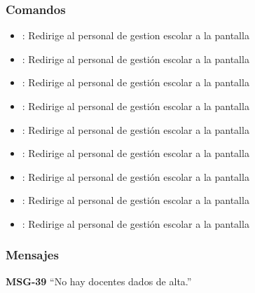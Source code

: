\subsubsection{Comandos}
\begin{itemize}
    \item {}: Redirige al personal de gestion escolar a la pantalla 
    
    \item {}: Redirige al personal de gestión escolar a la pantalla 
    \item {}: Redirige al personal de gestión escolar a la pantalla 
    
    \item {}: Redirige al personal de gestión escolar a la pantalla 
    \item {}: Redirige al personal de gestión escolar a la pantalla 
    
    \item {}: Redirige al personal de gestión escolar a la pantalla 
    \item {}: Redirige al personal de gestión escolar a la pantalla 
    
    \item {}: Redirige al personal de gestión escolar a la pantalla 
    \item {}: Redirige al personal de gestión escolar a la pantalla    
\end{itemize}

\subsubsection{Mensajes}

\begin{Citemize}
    \item {\bf MSG-39}  ``No hay docentes dados de alta.''
\end{Citemize}


